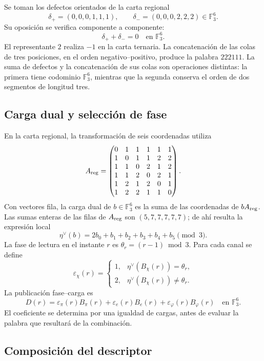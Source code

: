 Se toman los defectos orientados de la carta regional
\[
 \delta_+=(0,0,0,1,1,1),\qquad
 \delta_-=(0,0,0,2,2,2)\in\mathbb F_3^6.
\]
Su oposición se verifica componente a componente:
\[
 \delta_++\delta_-=0\quad\text{en }\mathbb F_3^6.
\]
El representante $2$ realiza $-1$ en la carta ternaria. La concatenación
de las colas de tres posiciones, en el orden negativo--positivo, produce
la palabra $222111$. La suma de defectos y la concatenación de sus
colas son operaciones distintas: la primera tiene codominio
$\mathbb F_3^6$, mientras que la segunda conserva el orden de dos
segmentos de longitud tres.

\subsection{Carga dual y selección de fase}

En la carta regional, la transformación de seis coordenadas utiliza
\[
 A_{\rm reg}=
 \begin{pmatrix}
 0&1&1&1&1&1\\
 1&0&1&1&2&2\\
 1&1&0&2&1&2\\
 1&1&2&0&2&1\\
 1&2&1&2&0&1\\
 1&2&2&1&1&0
 \end{pmatrix}.
\]
Con vectores fila, la carga dual de $b\in\mathbb F_3^6$ es la suma
de las coordenadas de $bA_{\rm reg}$. Las sumas enteras de las filas de
$A_{\rm reg}$ son $(5,7,7,7,7,7)$; de ahí resulta la expresión local
\begin{equation}
 \eta^\vee(b)=2b_0+b_1+b_2+b_3+b_4+b_5\pmod3.
 \label{eq:kdes-cargadual}
\end{equation}
La fase de lectura en el instante $r$ es
$\theta_r=(r-1)\bmod3$. Para cada canal se define
\[
 \varepsilon_\chi(r)=
 \begin{cases}
 1,&\eta^\vee(B_\chi(r))=\theta_r,\\
 2,&\eta^\vee(B_\chi(r))\ne\theta_r.
 \end{cases}
\]
La publicación fase--carga es
\begin{equation}
 D(r)=\varepsilon_\pi(r)B_\pi(r)
      +\varepsilon_e(r)B_e(r)
      +\varepsilon_\varphi(r)B_\varphi(r)
      \quad\text{en }\mathbb F_3^6.
 \label{eq:kdes-fasecarga}
\end{equation}
El coeficiente se determina por una igualdad de cargas, antes de evaluar
la palabra que resultará de la combinación.

\subsection{Composición del descriptor}

